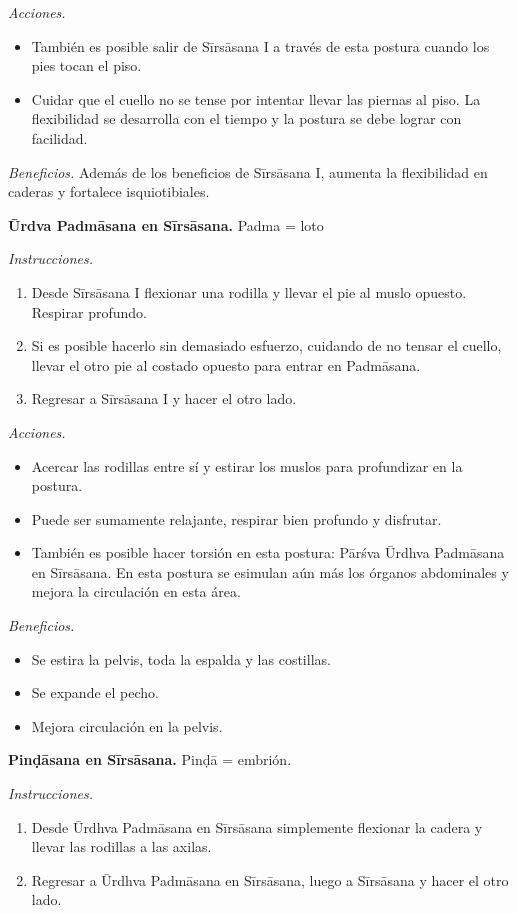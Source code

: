 \emph{Acciones.}
\begin{itemize}
\item También es posible salir de Sīrsāsana I
a través de esta postura cuando los pies
tocan el piso.
\item Cuidar que el cuello no se tense por
intentar llevar las piernas al piso. La
flexibilidad se desarrolla con el tiempo y la
postura se debe lograr con facilidad.
\end{itemize}

\emph{Beneficios.} Además de los beneficios
de Sīrsāsana I, aumenta la flexibilidad en
caderas y fortalece isquiotibiales.

\medskip\noindent\textbf{Ūrdva Padmāsana en
Sīrsāsana.}
Padma = loto

\emph{Instrucciones.}
\begin{enumerate}
\item Desde Sīrsāsana I flexionar una rodilla
y llevar el pie al muslo opuesto. Respirar
profundo.
\item Si es posible hacerlo sin demasiado
esfuerzo, cuidando de no tensar el cuello,
llevar el otro pie al costado opuesto para
entrar en Padmāsana.
\item Regresar a Sīrsāsana I y hacer el otro
lado.
\end{enumerate}

\emph{Acciones.}
\begin{itemize}
\item Acercar las rodillas entre sí y estirar
los muslos para profundizar en la postura.
\item Puede ser sumamente relajante, respirar
bien profundo y disfrutar.
\item También es posible hacer torsión en
esta postura: Pārśva Ūrdhva Padmāsana en
Sīrsāsana. En esta postura se esimulan aún
más los órganos abdominales y mejora la
circulación en esta área.
\end{itemize}

\emph{Beneficios.}
\begin{itemize}
\item Se estira la pelvis, toda la espalda y
las costillas.
\item Se expande el pecho.
\item Mejora circulación en la pelvis.
\end{itemize}

\medskip\noindent\textbf{Pinḍāsana en
Sīrsāsana.}
Pinḍā = embrión.

\emph{Instrucciones.}
\begin{enumerate}
\item Desde Ūrdhva Padmāsana en Sīrsāsana
simplemente flexionar la cadera y llevar las
rodillas a las axilas.
\item Regresar a Ūrdhva Padmāsana en
Sīrsāsana, luego a Sīrsāsana y hacer el otro
lado.
\end{enumerate}

